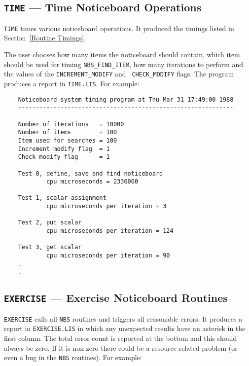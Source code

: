 \subsection {{\tt TIME} --- Time Noticeboard Operations}

{\tt TIME} times various noticeboard operations. It produced the timings listed
in Section~\ref {Routine Timings}.

The user chooses how many items the noticeboard should contain, which item
should be used for timing {\tt NBS\_FIND\_ITEM}, how many iterations to perform
and the values of the {\tt INC\-RE\-MENT\_\-MOD\-IFY} and {\tt
CHECK\_\-MOD\-IFY} flags. The program produces a report in {\tt TIME.LIS}. For
example:

\begin {verbatim}
    Noticeboard system timing program at Thu Mar 31 17:49:00 1988
    -------------------------------------------------------------

    Number of iterations   = 10000
    Number of items        = 100
    Item used for searches = 100
    Increment modify flag  = 1
    Check modify flag      = 1

    Test 0, define, save and find noticeboard
            cpu microseconds = 2330000

    Test 1, scalar assignment
            cpu microseconds per iteration = 3

    Test 2, put scalar
            cpu microseconds per iteration = 124

    Test 3, get scalar
            cpu microseconds per iteration = 90
    .
    .
\end{verbatim}

\subsection {{\tt EXERCISE} --- Exercise Noticeboard Routines}

{\tt EXERCISE} calls all {\tt NBS} routines and triggers all reasonable
errors. It produces a report in {\tt EXERCISE.LIS} in which any unexpected
results have an asterisk in the first column. The total error count is reported
at the bottom and this should always be zero. If it is non-zero there could
be a resource-related problem (or even a bug in the {\tt NBS} routines).
For example:

